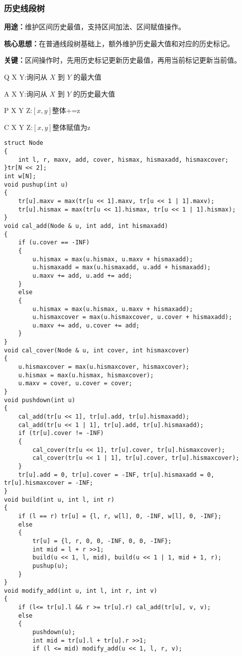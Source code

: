 \documentclass[a4paper, fontset=none]{ctexart}
\begin{document}
\subsubsection{历史线段树}
\textbf{用途：}维护区间历史最值，支持区间加法、区间赋值操作。

\textbf{核心思想：}在普通线段树基础上，额外维护历史最大值和对应的历史标记。

\textbf{关键：}区间操作时，先用历史标记更新历史最值，再用当前标记更新当前值。

Q X Y:询问从 $X$ 到 $Y$ 的最大值

A X Y:询问从 $X$ 到 $Y$ 的历史最大值

P X Y Z:$[x, y]$整体+=z

C X Y Z:$[x, y]$整体赋值为z

\begin{verbatim}
struct Node
{
    int l, r, maxv, add, cover, hismax, hismaxadd, hismaxcover;
}tr[N << 2];
int w[N];
void pushup(int u)
{
    tr[u].maxv = max(tr[u << 1].maxv, tr[u << 1 | 1].maxv);
    tr[u].hismax = max(tr[u << 1].hismax, tr[u << 1 | 1].hismax);
}
void cal_add(Node & u, int add, int hismaxadd)
{
    if (u.cover == -INF)
    {
        u.hismax = max(u.hismax, u.maxv + hismaxadd);
        u.hismaxadd = max(u.hismaxadd, u.add + hismaxadd);
        u.maxv += add, u.add += add;
    }
    else
    {
        u.hismax = max(u.hismax, u.maxv + hismaxadd);
        u.hismaxcover = max(u.hismaxcover, u.cover + hismaxadd);
        u.maxv += add, u.cover += add;
    }
}
void cal_cover(Node & u, int cover, int hismaxcover)
{
    u.hismaxcover = max(u.hismaxcover, hismaxcover);
    u.hismax = max(u.hismax, hismaxcover);
    u.maxv = cover, u.cover = cover;
}
void pushdown(int u)
{
    cal_add(tr[u << 1], tr[u].add, tr[u].hismaxadd);
    cal_add(tr[u << 1 | 1], tr[u].add, tr[u].hismaxadd);
    if (tr[u].cover != -INF)
    {
        cal_cover(tr[u << 1], tr[u].cover, tr[u].hismaxcover);
        cal_cover(tr[u << 1 | 1], tr[u].cover, tr[u].hismaxcover);
    }
    tr[u].add = 0, tr[u].cover = -INF, tr[u].hismaxadd = 0, tr[u].hismaxcover = -INF;
}
void build(int u, int l, int r)
{
    if (l == r) tr[u] = {l, r, w[l], 0, -INF, w[l], 0, -INF};
    else
    {
        tr[u] = {l, r, 0, 0, -INF, 0, 0, -INF};
        int mid = l + r >>1;
        build(u << 1, l, mid), build(u << 1 | 1, mid + 1, r);
        pushup(u);
    }
}
void modify_add(int u, int l, int r, int v)
{
    if (l<= tr[u].l && r >= tr[u].r) cal_add(tr[u], v, v);
    else
    {
        pushdown(u);
        int mid = tr[u].l + tr[u].r >>1;
        if (l <= mid) modify_add(u << 1, l, r, v);

\end{verbatim}
\end{document}
